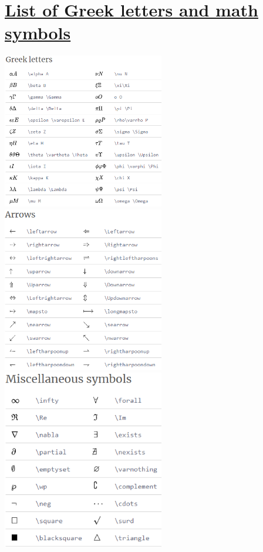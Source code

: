 \documentclass[11 pt]{book}
\begin{document}
\section{\href{https://www.overleaf.com/learn/latex/List_of_Greek_letters_and_math_symbols}{List of Greek letters and math symbols}}
\begin{center}
	\includegraphics[width=200pt]{Greek Letters.png} 
	\includegraphics[width=200pt]{Arrows.png}
	\includegraphics[width=200pt]{Miscellaneous symbols.png}

\end{center}
\end{document}
